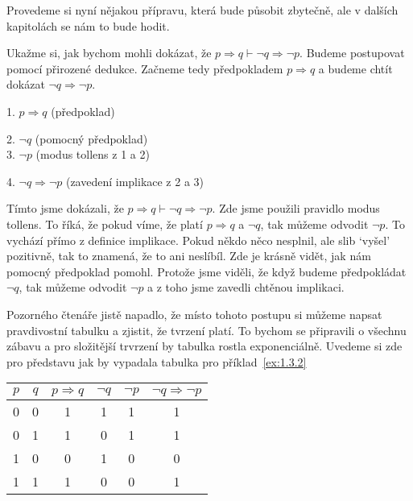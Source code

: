 Provedeme si nyní nějakou přípravu, která bude působit zbytečně, ale v dalších kapitolách se nám to bude hodit.
\begin{example}
  Ukažme si, jak bychom mohli dokázat, že $p \Rightarrow q \vdash \neg q \Rightarrow \neg p$. Budeme postupovat pomocí přirozené dedukce. Začneme tedy předpokladem $p \Rightarrow q$ a budeme chtít dokázat $\neg q \Rightarrow \neg p$. 
  \begin{proofbox}
    1. $p \Rightarrow q$ (předpoklad) 
    \begin{proofbox}
      2. $\neg q$ (pomocný předpoklad) \\
      3. $\neg p$ (modus tollens z 1 a 2)
    \end{proofbox}
    4. $\neg q \Rightarrow \neg p$ (zavedení implikace z 2 a 3)
  \end{proofbox}
  Tímto jsme dokázali, že $p \Rightarrow q \vdash \neg q \Rightarrow \neg p$. Zde jsme použili pravidlo modus tollens. To říká, že pokud víme, že platí $p \Rightarrow q$ a $\neg q$, tak můžeme odvodit $\neg p$. To vychází přímo z definice implikace. Pokud někdo něco nesplnil, ale slib `vyšel' pozitivně, tak to znamená, že to ani neslíbíl. Zde je krásně vidět, jak nám pomocný předpoklad pomohl. Protože jsme viděli, že když budeme předpokládat $\neg q$, tak můžeme odvodit $\neg p$ a z toho jsme zavedli chtěnou implikaci.
\end{example}

Pozorného čtenáře jistě napadlo, že místo tohoto postupu si můžeme napsat pravdivostní tabulku a zjistit, že tvrzení platí. To bychom se připravili o všechnu zábavu a pro složitější trvrzení by tabulka rostla exponenciálně.
Uvedeme si zde pro představu jak by vypadala tabulka pro příklad~\ref{ex:1.3.2}
\begin{center}
  \begin{tabular}{|c|c|c|c|c|c|}
    \hline
    $p$ & $q$ & $p \Rightarrow q$ & $\neg q$ & $\neg p$ & $\neg q \Rightarrow \neg p$ \\
    \hline
    0 & 0 & 1 & 1 & 1 & 1 \\
    0 & 1 & 1 & 0 & 1 & 1 \\
    1 & 0 & 0 & 1 & 0 & 0 \\
    1 & 1 & 1 & 0 & 0 & 1 \\
    \hline
  \end{tabular}
\end{center}

